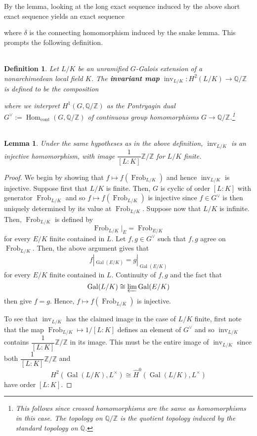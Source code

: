 \documentclass[11pt]{article}
\newcommand{\Q}{\mathbb{Q}}
\newcommand{\Z}{\mathbb{Z}}
\newcommand{\df}{\dfrac}
\newcommand{\iso}{\cong}
\DeclareMathOperator{\cont}{cont} %
\DeclareMathOperator{\Frob}{Frob} %
\DeclareMathOperator{\Gal}{Gal}
\DeclareMathOperator{\Hom}{Hom}
\DeclareMathOperator{\inv}{inv} %
\newcommand{\flim}{\varprojlim}
\newtheorem*{definition*}{\\Definition}
\newtheorem*{lemma*}{\\Lemma}
\begin{document}
By the lemma, looking at the long exact sequence induced by the above short exact sequence yields an exact sequence
\begin{center}
\end{center}
where $\delta$ is the connecting homomorphism induced by the snake lemma. This prompts the following definition.

\begin{definition*}
Let $L/K$ be an unramified $G$-Galois extension of a nonarchimedean local field $K$. The \textbf{invariant map} $\inv_{L/K}: H^2(L/K)\to\Q/\Z$ is defined to be the composition
\begin{center}
\end{center}
where we interpret $H^1(G,\Q/\Z)$ as the Pontryagin dual $G^{\vee}:=\Hom_{\cont}(G,\Q/\Z)$ of continuous group homomorphisms $G\to\Q/\Z$.\footnote{This follows since crossed homomorphisms are the same as homomorphisms in this case. The topology on $\Q/\Z$ is the quotient topology induced by the standard topology on $\Q$.}
\end{definition*}

\begin{lemma*}
Under the same hypotheses as in the above definition, $\inv_{L/K}$ is an injective homomorphism, with image $\df{1}{[L:K]}\Z/\Z$ for $L/K$ finite.
\end{lemma*}
\begin{proof}
We begin by showing that $f\mapsto f(\Frob_{L/K})$ and hence $\inv_{L/K}$ is injective. Suppose first that $L/K$ is finite. Then, $G$ is cyclic of order $[L:K]$ with generator $\Frob_{L/K}$ and so $f\mapsto f(\Frob_{L/K})$ is injective since $f\in G^{\vee}$ is then uniquely determined by its value at $\Frob_{L/K}$. Suppose now that $L/K$ is infinite. Then, $\Frob_{L/K}$ is defined by 
$$\Frob_{L/K}|_E=\Frob_{E/K}$$
for every $E/K$ finite contained in $L$. Let $f,g\in G^{\vee}$ such that $f,g$ agree on $\Frob_{L/K}$. Then, the above argument gives that 
$$f|_{\Gal(E/K)}=g|_{\Gal(E/K)}$$ 
for every $E/K$ finite contained in $L$. Continuity of $f,g$ and the fact that 
$$\Gal(L/K)\iso\flim\Gal(E/K)$$
then give $f=g$. Hence, $f\mapsto f(\Frob_{L/K})$ is injective.

To see that $\inv_{L/K}$ has the claimed image in the case of $L/K$ finite, first note that the map $\Frob_{L/K}\mapsto1/[L:K]$ defines an element of $G^{\vee}$ and so $\inv_{L/K}$ contains $\df{1}{[L:K]}\Z/\Z$ in its image. This must be the entire image of $\inv_{L/K}$ since both $\df{1}{[L:K]}\Z/\Z$ and 
$$H^2(\Gal(L/K),L^{\times})\iso\hat{H}^0(\Gal(L/K),L^{\times})$$ 
have order $[L:K]$.
\end{proof}
\end{document}
